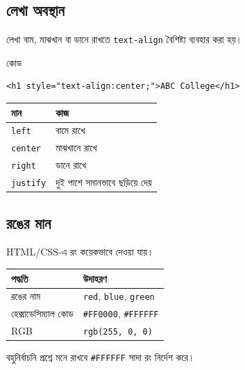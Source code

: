 \subsection{লেখা অবস্থান}

লেখা বাম, মাঝখান বা ডানে রাখতে \texttt{text-align} বৈশিষ্ট্য ব্যবহার করা হয়।

\begin{examplebox}{কোড}
\par\noindent\begin{minipage}{\linewidth}
\begin{verbatim}
<h1 style="text-align:center;">ABC College</h1>
\end{verbatim}
\end{minipage}\par
\end{examplebox}

\begin{center}
\begin{tabular}{|p{}|p{}|}
\hline
\textbf{মান} & \textbf{কাজ} \\
\hline
\texttt{left} & বামে রাখে \\
\hline
\texttt{center} & মাঝখানে রাখে \\
\hline
\texttt{right} & ডানে রাখে \\
\hline
\texttt{justify} & দুই পাশে সমানভাবে ছড়িয়ে দেয় \\
\hline
\end{tabular}
\end{center}

\subsection{রঙের মান}

HTML/CSS-এ রং কয়েকভাবে দেওয়া যায়।

\begin{center}
\begin{tabular}{|p{}|p{}|}
\hline
\textbf{পদ্ধতি} & \textbf{উদাহরণ} \\
\hline
রঙের নাম & \texttt{red}, \texttt{blue}, \texttt{green} \\
\hline
হেক্সাডেসিম্যাল কোড & \texttt{\#FF0000}, \texttt{\#FFFFFF} \\
\hline
RGB & \texttt{rgb(255, 0, 0)} \\
\hline
\end{tabular}
\end{center}

\begin{boardbox}{বহুনির্বাচনি প্রশ্নে মনে রাখবে}
\texttt{\#FFFFFF} সাদা রং নির্দেশ করে।
\end{boardbox}


